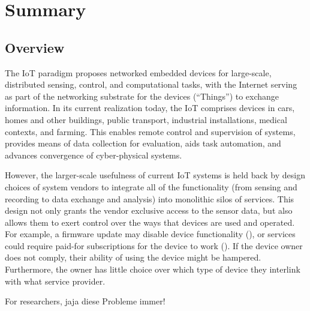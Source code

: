 
\section*{Summary}


\subsection*{Overview}


The \acrfull{IoT} paradigm proposes networked embedded devices
for large-scale, distributed sensing, control, and computational tasks,
with the Internet serving as part of the networking substrate for
the devices (``Things'') to exchange information.
In its current realization today, the \acrlong{IoT} comprises
devices in cars, homes and other buildings, public transport,
industrial installations, medical contexts, and farming.
This enables remote control and supervision of systems, provides
means of data collection for evaluation, aids
task automation, and advances convergence of cyber-physical systems.

However, the larger-scale usefulness of current \acrlong{IoT}
systems is held back by design choices of system vendors to
integrate all of the functionality (from sensing and recording
to data exchange and analysis) into monolithic silos of services.
This design not only grants the vendor exclusive access to the
sensor data, but also allows them to exert control over the ways
that devices are used and operated. For example, a firmware update
may disable device functionality (), or services could
require paid-for subscriptions for the device to work
().
If the device owner does not comply, their ability of using
the device might be hampered. Furthermore, the owner has little
choice over which type of device they interlink with what service
provider.

For researchers, jaja diese Probleme immer!



